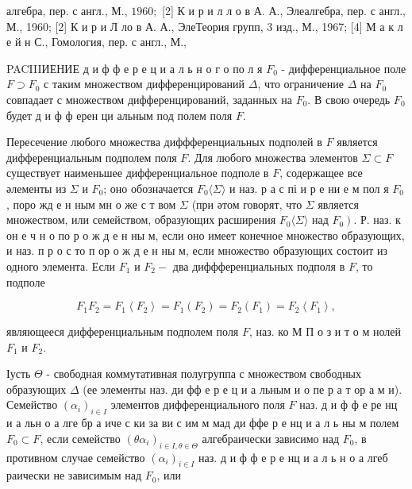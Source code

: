 \documentclass[10pt]{article}
\begin{document}
алгебра, пер. с англ., М., $1960 ;$ [2] К и р и л л о в А. А., Элеалгебра, пер. с англ., М., 1960; [2] К и р и Л ло в А. А., ЭлеТеория групп, 3 изд., М., 1967; [4] М а к л е й н С., Гомология, пер. с англ., М.,



PACIIIИЕНИЕ д и ф ф е р е ц и а л ь н о г о по л я $F_{0}$ - дифференциальное поле $F \supset F_{0}$ с таким множеством дифференцирований $\Delta$, что ограничение $\Delta$ на $F_{0}$ совпадает с множеством дифференцирований, заданных на $F_{0}$. В свою очередь $F_{0}$ будет д и ф ф ерен ци альным под полем поля $F$.



Пересечение любого множества диффференциальных подполей в $F$ является дифференциальным подполем поля $F$. Для любого множества элементов $\Sigma \subset F$ существует наименьшее дифференциальное подполе в $F$, содержащее все әлементы из $\Sigma$ и $F_{0}$; оно обозначается $F_{0}\langle\Sigma\rangle$ и наз. р а с пі и р е ни е м пол я $F_{0}$, поро жд е н ным мн о же с т вом $\Sigma$ (при әтом говорят, что $\Sigma$ является множеством, или семейством, образующих расширения $F_{0}\langle\Sigma\rangle$ над $\left.F_{0}\right)$. Р. наз. к он е ч н о по р о ж д е н ны м, если оно имеет конечное множество образующих, и наз. п р о с то п ор о ж д е н ны м, если множество образующих состоит из одного элемента. Если $F_{1}$ и $F_{2}-$ два диффференциальных подполя в $F$, то подполе



\[

F_{1} F_{2}=F_{1}\left\langle F_{2}\right\rangle=F_{1}\left(F_{2}\right)=F_{2}\left(F_{1}\right)=F_{2}\left\langle F_{1}\right\rangle,

\]



являющееся дифференциальным подполем поля $F$, наз. ко М П о з и т о м нолей $F_{1}$ и $F_{2}$.



Іусть $\Theta$ - свободная коммутативная полугруппа с множеством свободных образующих $\Delta$ (ее элементы наз. ди фф е р е ц и а льным и о пе р а т ор а м и). Семейство $\left(\alpha_{i}\right)_{i \in I}$ элементов дифференциального поля $F$ наз. д и ф ф е ре нц и а льн о а лге бр а иче с ки за ви с им м мад ди ффе р е нц и а л ь ны м полем $F_{0} \subset F$, если семейство $\left(\theta \alpha_{i}\right)_{i \in I, \theta \in \Theta}$ алгебраически зависимо над $F_{0}$, в противном случае семейство $\left(\alpha_{i}\right)_{i \in I}$ наз. д и ф ф е р е нц и а л ь н о а лгеб раически не зависимым над $F_{0}$, или
\end{document}
